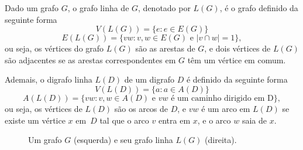 \begin{definicao}
Dado um grafo $G$, o grafo linha de $G$, denotado por $L(G)$, é o grafo definido da seguinte forma
\[V(L(G)) = \{e : e \in E(G)\}\]
\[E(L(G)) = \{vw : v,w \in E(G) \text{ e } |v \cap w| = 1\},\]
ou seja, os vértices do grafo $L(G)$ são as arestas de $G$, e dois vértices de $L(G)$ são adjacentes se as arestas correspondentes em $G$ têm um vértice em comum.

Ademais, o digrafo linha $L(D)$ de um digrafo $D$ é definido da seguinte forma
\[V(L(D)) = \{a : a \in A(D)\}\]
\[A(L(D)) = \{vw : v,w \in A(D) \text{ e } vw \text{ é um caminho dirigido em D}\},\]
ou seja, os vértices de $L(D)$ são os arcos de $D$, e $vw$ é um arco em $L(D)$ se existe um vértice $x$ em~$D$ tal que o arco $v$ entra em $x$, e o arco $w$ saia de $x$.
\end{definicao}

\begin{figure}[H]
\centering
{}
\caption{Um grafo $G$ (esquerda) e seu grafo linha $L(G)$ (direita).}
\label{fig:shiftlinegraph}
\end{figure}

